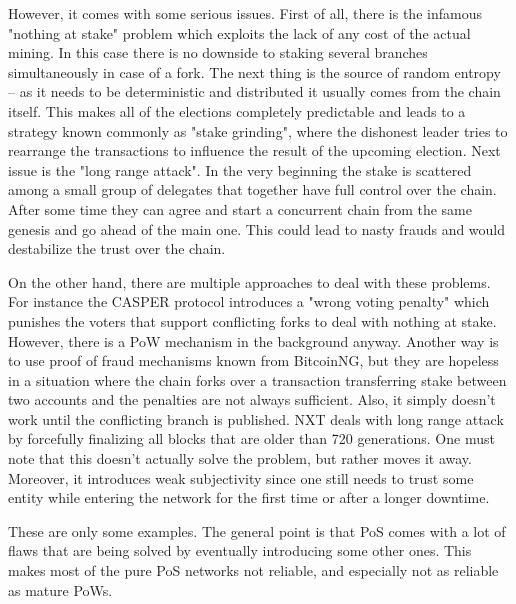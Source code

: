However, it comes with some serious issues. First of all, there is the infamous "nothing at stake"
\cite{pos_flaws_nothing}
problem which exploits the lack of any cost of the actual mining. In this case
there is no downside to staking several branches simultaneously in case of a fork.
The next thing is the source of random entropy – as it needs to be deterministic
and distributed it usually comes from the chain itself. This
makes all of the elections completely predictable and leads to a strategy known
commonly as "stake grinding", where the dishonest leader tries to rearrange the
transactions to influence the result of the upcoming election. Next issue is the
"long range attack"\cite{pos_flaws_long}.
In the very beginning the stake is scattered among a small
group of delegates that together have full control over the chain. After
some time they can agree and start a concurrent chain from the same genesis
and go ahead of the main one. This could lead to nasty frauds and would
destabilize the trust over the chain.

On the other hand, there are multiple approaches to deal with these problems. For instance
the CASPER protocol introduces a "wrong voting penalty" which punishes the
voters that support conflicting forks to deal with nothing at stake\cite{casper}.
However, there is a PoW mechanism in the background anyway. Another way is to use
proof of fraud mechanisms known from BitcoinNG\cite{bcng},
but they are hopeless in a situation where the chain forks over a transaction
transferring stake between two accounts and the penalties are not always
sufficient. Also, it simply doesn't work until the
conflicting branch is published. NXT deals with long range attack by forcefully
finalizing all blocks that are older than 720 generations\cite{nxt}.
One must note that this doesn't actually solve the problem, but rather moves it
away. Moreover, it introduces weak subjectivity since one still needs to trust
some entity while entering the network for the first time or after a longer downtime.

These are only some examples. The general point is that PoS comes with a lot
of flaws that are being solved by eventually introducing some other ones. This
makes most of the pure PoS networks not reliable, and especially not as reliable
as mature PoWs.
